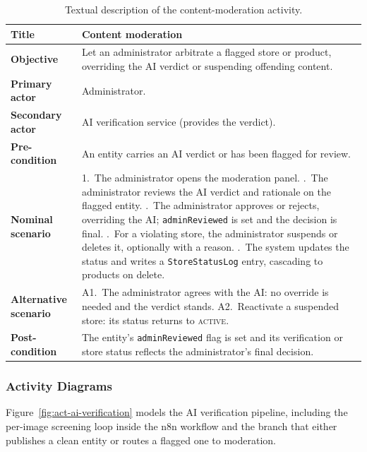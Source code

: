 \begin{table}[H]
  \centering
  \caption{Textual description of the content-moderation activity.}
  \label{tab:act-moderation-desc}
  \renewcommand{\arraystretch}{1.3}
  \begin{tabularx}{\textwidth}{|>{\bfseries}p{3.2cm}|X|}
    \hline
    Title & Content moderation \\ \hline
    Objective & Let an administrator arbitrate a flagged store or product, overriding the AI verdict or suspending offending content. \\ \hline
    Primary actor & Administrator. \\ \hline
    Secondary actor & AI verification service (provides the verdict). \\ \hline
    Pre-condition & An entity carries an AI verdict or has been flagged for review. \\ \hline
    Nominal scenario & 1.~The administrator opens the moderation panel. \newline 2.~The administrator reviews the AI verdict and rationale on the flagged entity. \newline 3.~The administrator approves or rejects, overriding the AI; \texttt{adminReviewed} is set and the decision is final. \newline 4.~For a violating store, the administrator suspends or deletes it, optionally with a reason. \newline 5.~The system updates the status and writes a \texttt{StoreStatusLog} entry, cascading to products on delete. \\ \hline
    Alternative scenario & A1.~The administrator agrees with the AI: no override is needed and the verdict stands. \newline A2.~Reactivate a suspended store: its status returns to \textsc{active}. \\ \hline
    Post-condition & The entity's \texttt{adminReviewed} flag is set and its verification or store status reflects the administrator's final decision. \\ \hline
  \end{tabularx}
\end{table}

\subsubsection{Activity Diagrams}

Figure~\ref{fig:act-ai-verification} models the AI verification pipeline,
including the per-image screening loop inside the n8n workflow and the
branch that either publishes a clean entity or routes a flagged one to
moderation.

